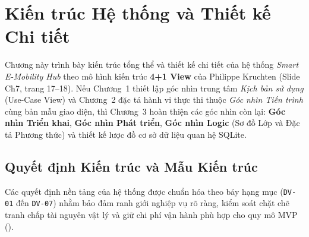 \section{Kiến trúc Hệ thống và Thiết kế Chi tiết}

Chương này trình bày kiến trúc tổng thể và thiết kế chi tiết của hệ thống \textit{Smart E-Mobility Hub} theo mô hình kiến trúc \textbf{4+1 View} của Philippe Kruchten (Slide Ch7, trang 17--18). Nếu Chương~1 thiết lập góc nhìn trung tâm \textit{Kịch bản sử dụng} (Use-Case View) và Chương~2 đặc tả hành vi thực thi thuộc \textit{Góc nhìn Tiến trình} cùng bản mẫu giao diện, thì Chương~3 hoàn thiện các góc nhìn còn lại: \textbf{Góc nhìn Triển khai}, \textbf{Góc nhìn Phát triển}, \textbf{Góc nhìn Logic} (Sơ đồ Lớp và Đặc tả Phương thức) và thiết kế lược đồ cơ sở dữ liệu quan hệ SQLite.

\subsection{Quyết định Kiến trúc và Mẫu Kiến trúc}

Các quyết định nền tảng của hệ thống được chuẩn hóa theo bảy hạng mục (\texttt{DV-01} đến \texttt{DV-07}) nhằm bảo đảm ranh giới nghiệp vụ rõ ràng, kiểm soát chặt chẽ tranh chấp tài nguyên vật lý và giữ chi phí vận hành phù hợp cho quy mô MVP ().


